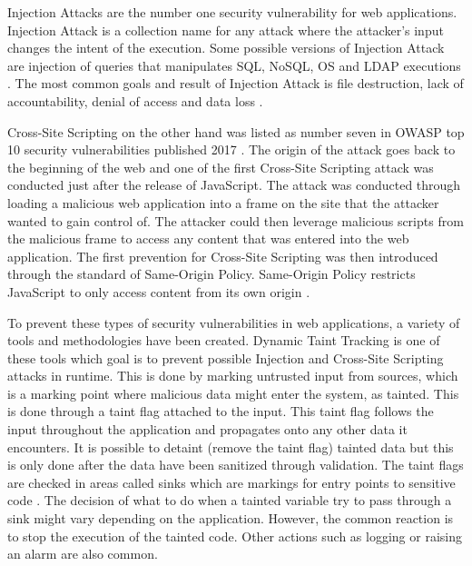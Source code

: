 \documentclass{../kththesis}
\begin{document}
	Injection Attacks are the number one security vulnerability for web applications. Injection Attack is a collection name for any attack where the attacker’s input changes the intent of the execution. Some possible versions of Injection Attack are injection of queries that manipulates SQL, NoSQL, OS and LDAP executions \parencite{OWASP2017}. The most common goals and result of Injection Attack is file destruction, lack of accountability, denial of access and data loss \parencite{Secure_Web}.
	
	Cross-Site Scripting on the other hand was listed as number seven in OWASP top 10 security vulnerabilities published 2017 \parencite{OWASP2017}. The origin of the attack goes back to the beginning of the web and one of the first Cross-Site Scripting attack was conducted just after the release of JavaScript. The attack was conducted through loading a malicious web application into a frame on the site that the attacker wanted to gain control of. The attacker could then leverage malicious scripts from the malicious frame to access any content that was entered into the web application. The first prevention for Cross-Site Scripting was then introduced through the standard of Same-Origin Policy. Same-Origin Policy restricts JavaScript to only access content from its own origin \parencite{FogieSeth2007Xacs, w3csop}.
	
	To prevent these types of security vulnerabilities in web applications, a variety of tools and methodologies have been created. Dynamic Taint Tracking is one of these tools which goal is to prevent possible Injection and Cross-Site Scripting attacks in runtime. This is done by marking untrusted input from sources, which is a marking point where malicious data might enter the system, as tainted. This is done through a taint flag attached to the input. This taint flag follows the input throughout the application and propagates onto any other data it encounters. It is possible to detaint (remove the taint flag) tainted data but this is only done after the data have been sanitized through validation. The taint flags are checked in areas called sinks which are markings for entry points to sensitive code \parencite{Pan2015, Venkataramani2008}. The decision of what to do when a tainted variable try to pass through a sink might vary depending on the application. However, the common reaction is to stop the execution of the tainted code. Other actions such as logging or raising an alarm are also common. 
	
\end{document}
